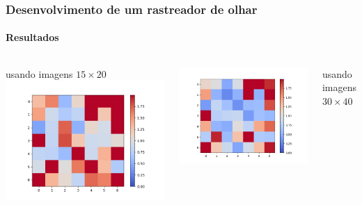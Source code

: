 \documentclass[11pt]{beamer}
\begin{document}
\begin{frame}
\frametitle{Desenvolvimento de um rastreador de olhar}
\framesubtitle{Resultados}


\begin{columns}[t]
\centering
\tiny{usando imagens $15 \times 20$}
\includegraphics[scale=.3]{imagens/erros5pyrDown.png}

\includegraphics[scale=.3]{imagens/erros4pyrDown.png}

\tiny{usando imagens $30 \times 40$}


\end{columns}
\end{frame}
\end{document}

